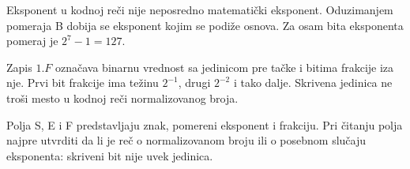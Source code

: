 Eksponent u kodnoj reči nije neposredno matematički eksponent. Oduzimanjem pomeraja B dobija se eksponent kojim se podiže osnova. Za osam bita eksponenta pomeraj je $2^7-1=127$.

Zapis $1.F$ označava binarnu vrednost sa jedinicom pre tačke i bitima frakcije iza nje. Prvi bit frakcije ima težinu $2^{-1}$, drugi $2^{-2}$ i tako dalje. Skrivena jedinica ne troši mesto u kodnoj reči normalizovanog broja.

Polja S, E i F predstavljaju znak, pomereni eksponent i frakciju. Pri čitanju polja najpre utvrditi da li je reč o normalizovanom broju ili o posebnom slučaju eksponenta: skriveni bit nije uvek jedinica.
